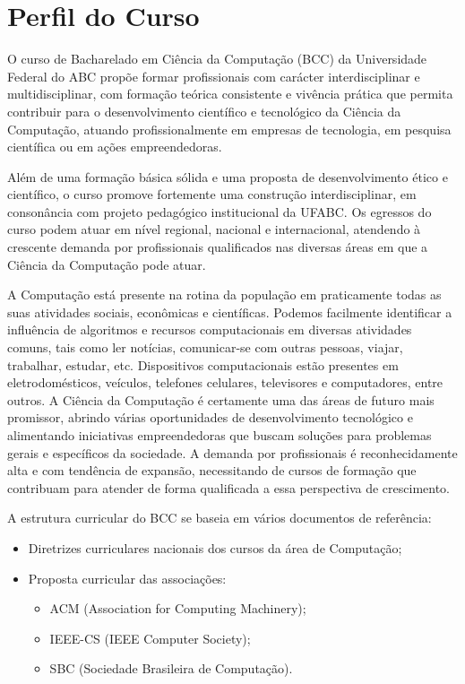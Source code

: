 \section{Perfil do Curso}

O curso de Bacharelado em Ciência da Computação (BCC) da Universidade Federal
do ABC propõe formar profissionais com carácter interdisciplinar e
multidisciplinar, com formação teórica consistente e vivência prática que
permita contribuir para o desenvolvimento científico e tecnológico da Ciência
da Computação, atuando profissionalmente em empresas de tecnologia, em pesquisa
científica ou em ações empreendedoras.

Além de uma formação básica sólida e uma proposta de desenvolvimento ético e
científico, o curso promove fortemente uma construção interdisciplinar, em
consonância com projeto pedagógico institucional da UFABC.
Os egressos do curso podem atuar em nível regional, nacional e internacional,
atendendo à crescente demanda por profissionais qualificados nas diversas
áreas em que a Ciência da Computação pode atuar.

A Computação está presente na rotina da população em praticamente todas as suas
atividades sociais, econômicas e científicas.
Podemos facilmente identificar a influência de algoritmos e recursos
computacionais em diversas atividades comuns, tais como ler notícias,
comunicar-se com outras pessoas, viajar, trabalhar, estudar, etc.
Dispositivos computacionais estão presentes em eletrodomésticos, veículos,
telefones celulares, televisores e computadores, entre outros.
A Ciência da Computação é certamente uma das áreas de futuro mais promissor,
abrindo várias oportunidades de desenvolvimento tecnológico e alimentando
iniciativas empreendedoras que buscam soluções para problemas gerais e
específicos da sociedade.
A demanda por profissionais é reconhecidamente alta e com tendência de
expansão, necessitando de cursos de formação que contribuam para atender de
forma qualificada a essa perspectiva de crescimento.

A estrutura curricular do BCC se baseia em vários documentos de referência:
\begin{itemize}
    \item Diretrizes curriculares nacionais dos cursos da área de Computação;
    \item Proposta curricular das associações:
    \begin{itemize}
        \item ACM (Association for Computing Machinery);
        \item IEEE-CS (IEEE Computer Society);
        \item SBC (Sociedade Brasileira de Computação).
    \end{itemize}
\end{itemize}

